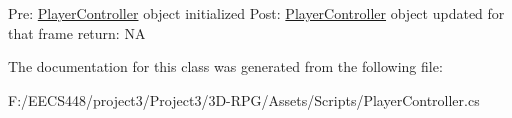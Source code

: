 Pre\+: \hyperlink{class_player_controller}{Player\+Controller} object initialized Post\+: \hyperlink{class_player_controller}{Player\+Controller} object updated for that frame return\+: NA 

The documentation for this class was generated from the following file\+:\begin{DoxyCompactItemize}
\item 
F\+:/\+E\+E\+C\+S448/project3/\+Project3/3\+D-\/\+R\+P\+G/\+Assets/\+Scripts/Player\+Controller.\+cs\end{DoxyCompactItemize}
